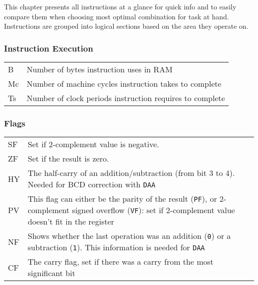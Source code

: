 \documentclass[12pt,twoside,openright,a4paper]{book}
\newcommand{\notet}{\rule{0pt}{2.4ex}}
\begin{document}
This chapter presents all instructions at a glance for quick info and to easily compare them when choosing most optimal combination for task at hand. Instructions are grouped into logical sections based on the area they operate on.

\minitoc

\pagebreak

\newcommand{\FS}{$\updownarrow$} %
\newcommand{\FN}{-}				%
\newcommand{\FU}{?}				%
\newcommand{\FX}{$\bullet$}		%
\newcommand{\FPV}{VF}			%
\newcommand{\FPP}{PF}			%

\subsubsection{Instruction Execution}

\begin{tabular}{ll}
	B & 
		Number of bytes instruction uses in RAM\\
	Mc\notet & 
		Number of machine cycles instruction takes to complete\\
	Ts\notet & 
		Number of clock periods instruction requires to complete\\
\end{tabular}

\subsubsection{Flags}

\begin{tabular}{lp{13cm}}
	SF & 
		Set if 2-complement value is negative.\\
	ZF\notet & 
		Set if the result is zero. \\
	HY\notet & 
		The half-carry of an addition/subtraction (from bit 3 to 4). Needed for BCD correction with {\tt DAA} \\
	PV\notet & 
		This flag can either be the parity of the result ({\tt \FPP}), or 2-complement signed overflow ({\tt \FPV}): set if 2-complement value doesn’t fit in the register \\
	NF\notet & 
		Shows whether the last operation was an addition ({\tt 0}) or a subtraction ({\tt 1}). This information is needed for {\tt DAA} \\
	CF\notet & 
		The carry flag, set if there was a carry from the most significant bit \\
\end{tabular}
\end{document}
